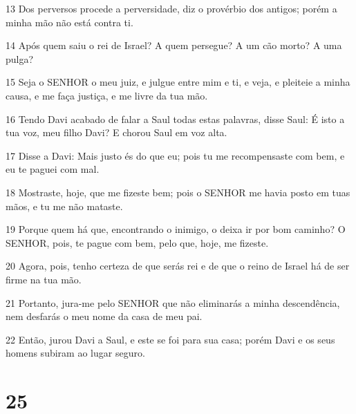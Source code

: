 \par 13 Dos perversos procede a perversidade, diz o provérbio dos antigos; porém a minha mão não está contra ti.
\par 14 Após quem saiu o rei de Israel? A quem persegue? A um cão morto? A uma pulga?
\par 15 Seja o SENHOR o meu juiz, e julgue entre mim e ti, e veja, e pleiteie a minha causa, e me faça justiça, e me livre da tua mão.
\par 16 Tendo Davi acabado de falar a Saul todas estas palavras, disse Saul: É isto a tua voz, meu filho Davi? E chorou Saul em voz alta.
\par 17 Disse a Davi: Mais justo és do que eu; pois tu me recompensaste com bem, e eu te paguei com mal.
\par 18 Mostraste, hoje, que me fizeste bem; pois o SENHOR me havia posto em tuas mãos, e tu me não mataste.
\par 19 Porque quem há que, encontrando o inimigo, o deixa ir por bom caminho? O SENHOR, pois, te pague com bem, pelo que, hoje, me fizeste.
\par 20 Agora, pois, tenho certeza de que serás rei e de que o reino de Israel há de ser firme na tua mão.
\par 21 Portanto, jura-me pelo SENHOR que não eliminarás a minha descendência, nem desfarás o meu nome da casa de meu pai.
\par 22 Então, jurou Davi a Saul, e este se foi para sua casa; porém Davi e os seus homens subiram ao lugar seguro.

\chapter{25}

